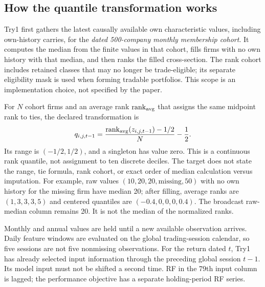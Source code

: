 \documentclass[11pt]{article}
\begin{document}
\subsection{How the quantile transformation works}
Try1 first gathers the latest causally available own characteristic values, including own-history carries, for the \emph{dated 500-company monthly membership cohort}. It computes the median from the finite values in that cohort, fills firms with no own history with that median, and then ranks the filled cross-section. The rank cohort includes retained classes that may no longer be trade-eligible; its separate eligibility mask is used when forming tradable portfolios. This scope is an implementation choice, not specified by the paper.

For $N$ cohort firms and an average rank $\operatorname{rank}_{\rm avg}$ that assigns the same midpoint rank to ties, the declared transformation is
\[
 q_{i,j,t-1}=\frac{\operatorname{rank}_{\rm avg}(z_{i,j,t-1})-1/2}{N}-\frac12.
\]
Its range is $(-1/2,1/2)$, and a singleton has value zero. This is a continuous rank quantile, not assignment to ten discrete deciles. The target does not state the range, tie formula, rank cohort, or exact order of median calculation versus imputation. For example, raw values $(10,20,20,\mathrm{missing},50)$ with no own history for the missing firm have median 20; after filling, average ranks are $(1,3,3,3,5)$ and centered quantiles are $(-0.4,0,0,0,0.4)$. The broadcast raw-median column remains 20. It is not the median of the normalized ranks.

Monthly and annual values are held until a new available observation arrives. Daily feature windows are evaluated on the global trading-session calendar, so five sessions are not five nonmissing observations. For the return dated $t$, Try1 has already selected input information through the preceding global session $t-1$. Its model input must not be shifted a second time. RF in the 79th input column is lagged; the performance objective has a separate holding-period RF series.
\end{document}
